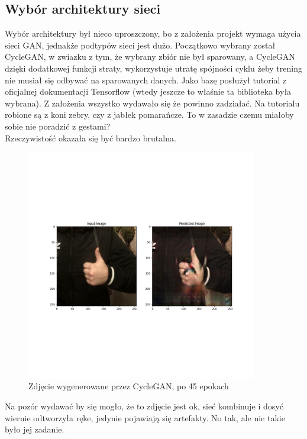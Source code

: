 \documentclass[12pt]{article}
\begin{document}
\begin{sloppypar}
{  \subsection{Wybór architektury sieci}
  {
    Wybór architektury był nieco uproszczony, bo z założenia projekt wymaga użycia sieci GAN, jednakże podtypów sieci jest dużo.
    Początkowo wybrany został CycleGAN, w zwiazku z tym, że wybrany zbiór nie był sparowany, a CycleGAN dzięki dodatkowej funkcji straty, wykorzystuje 
    utratę spójności cyklu żeby trening nie musiał się odbywać na sparowanych danych. 
    Jako bazę posłużył tutorial z oficjalnej dokumentacji Tensorflow \cite{cyclegan-tf} (wtedy jeszcze to właśnie ta biblioteka była wybrana).
    Z założenia wszystko wydawało się że powinno zadziałać. Na tutorialu robione są z koni zebry, czy z jabłek pomarańcze. 
    To w zasadzie czemu miałoby sobie nie poradzić z gestami?\\
    Rzeczywistość okazała się być bardzo brutalna.
    \begin{figure}[H]
      \centering
      \includegraphics[width=0.9\textwidth]{cycle-gan-45.jpg}
      \caption{Zdjęcie wygenerowane przez CycleGAN, po 45 epokach \cite{cyclegan-tf}}
      \label{fig:cycle-gan-przyklad}
    \end{figure}
    Na pozór wydawać by się mogło, że to zdjęcie jest ok, sieć kombinuje i dosyć wiernie odtworzyła ręke, jedynie pojawiają się artefakty.
    No tak, ale nie takie było jej zadanie. 
}}
\end{sloppypar}
\end{document}
